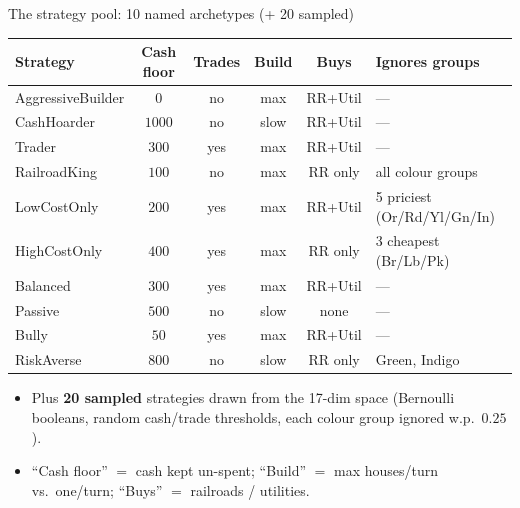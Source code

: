 \documentclass[10pt,aspectratio=169]{beamer}
\begin{document}
\begin{frame}{The strategy pool: 10 named archetypes (+ 20 sampled)}
  \centering
  \scriptsize
  \begin{tabular}{lccccl}
    \toprule
    Strategy & Cash floor & Trades & Build & Buys & Ignores groups \\
    \midrule
    AggressiveBuilder & $0$    & no  & max  & RR+Util & --- \\
    CashHoarder       & $1000$ & no  & slow & RR+Util & --- \\
    Trader            & $300$  & yes & max  & RR+Util & --- \\
    RailroadKing      & $100$  & no  & max  & RR only & all colour groups \\
    LowCostOnly       & $200$  & yes & max  & RR+Util & 5 priciest (Or/Rd/Yl/Gn/In) \\
    HighCostOnly      & $400$  & yes & max  & RR only & 3 cheapest (Br/Lb/Pk) \\
    Balanced          & $300$  & yes & max  & RR+Util & --- \\
    Passive           & $500$  & no  & slow & none    & --- \\
    Bully             & $50$   & yes & max  & RR+Util & --- \\
    RiskAverse        & $800$  & no  & slow & RR only & Green, Indigo \\
    \bottomrule
  \end{tabular}
  \vspace{0.7em}
  \begin{itemize}\small
    \item Plus \textbf{20 sampled} strategies drawn from the 17-dim space (Bernoulli booleans, random cash/trade thresholds, each colour group ignored w.p.\ $0.25$).
    \item ``Cash floor'' $=$ cash kept un-spent; ``Build'' $=$ max houses/turn vs.\ one/turn; ``Buys'' $=$ railroads / utilities.
  \end{itemize}
\end{frame}
\end{document}
